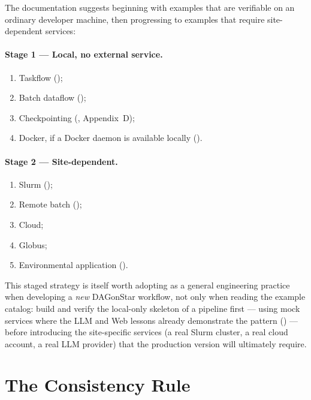 The documentation suggests beginning with examples that are verifiable on an
ordinary developer machine, then progressing to examples that require
site-dependent services:

\paragraph{Stage 1 --- Local, no external service.}
\begin{enumerate}[leftmargin=1.6em]
  \item Taskflow ();
  \item Batch dataflow ();
  \item Checkpointing (, Appendix~D);
  \item Docker, if a Docker daemon is available locally
    ().
\end{enumerate}

\paragraph{Stage 2 --- Site-dependent.}
\begin{enumerate}[leftmargin=1.6em]
  \item Slurm ();
  \item Remote batch ();
  \item Cloud;
  \item Globus;
  \item Environmental application ().
\end{enumerate}

\begin{practicebox}
This staged strategy is itself worth adopting as a general engineering
practice when developing a \emph{new} DAGonStar workflow, not only when
reading the example catalog: build and verify the local-only skeleton of a
pipeline first --- using mock services where the LLM and Web lessons already
demonstrate the pattern () --- before
introducing the site-specific services (a real Slurm cluster, a real cloud
account, a real LLM provider) that the production version will ultimately
require.
\end{practicebox}

\section{The Consistency Rule}

